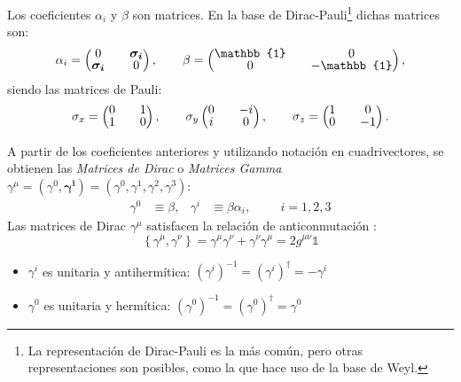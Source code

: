 Los coeficientes $\alpha_i$ y $\beta$ son matrices. En la base de Dirac-Pauli\footnote{La representación de Dirac-Pauli es la más común, pero otras representaciones son posibles, como la que hace uso de la base de Weyl.} dichas matrices son:
\begin{align}
\alpha _{i}=
\begingroup 
\renewcommand*{\arraystretch}{0.8}
\setlength\arraycolsep{10pt}
\begin{pmatrix} 
0 & \boldsymbol{\sigma_{i}} \\ \boldsymbol{\sigma_{i}} & 0 \end{pmatrix}, \qquad
\beta =\begin{pmatrix} \mathbb{1} & 0 \\ 0 & -\mathbb{1} \end{pmatrix},
\endgroup
\end{align}
siendo  las matrices de Pauli:
\begin{align}
\sigma _{x}=
\begingroup 
\renewcommand*{\arraystretch}{0.8}
\setlength\arraycolsep{10pt}
\begin{pmatrix} 
0 & 1 \\ 1 & 0 \end{pmatrix}, \qquad \sigma_y
\begin{pmatrix} 
0 & -i \\ i & 0 \end{pmatrix}, \qquad
\sigma_z =\begin{pmatrix} 1 & 0 \\ 0 & -1 \end{pmatrix}.
\endgroup
\end{align}

A partir de los coeficientes anteriores y utilizando notación en cuadrivectores, se obtienen las \textit{Matrices de Dirac} o \textit{Matrices Gamma}  $\gamma^{\mu}=(\gamma^0, \boldsymbol{\gamma^{i}})=(\gamma^0, \gamma^1, \gamma^2, \gamma^3)$:
\begin{align}
\gamma ^0 &\equiv \beta , & \gamma ^i &\equiv \beta \alpha_i , \hspace{1cm} i=1, 2, 3 \label{eq:matricesDirac}
\end{align}
Las matrices de Dirac $\gamma^{\mu}$ satisfacen la relación de anticonmutación \cite{MCR}:
\begin{equation}
\left\{ \gamma ^{\mu },\gamma ^{\nu }\right\} =\gamma ^{\mu }\gamma ^{\nu }+\gamma ^{\nu }\gamma ^{\mu }=2g^{\mu \nu }\mathbb{1}\label{eq:anticomm_relation}
\end{equation}
\begin{itemize}
\item $\gamma^{i}$ es unitaria y antihermítica: $\left( \gamma ^{i}\right) ^{-1}=\left( \gamma ^{i}\right) ^{\dagger}=-\gamma ^{i}$
\item $\gamma^{0}$ es unitaria y hermítica: $\left( \gamma ^{0}\right) ^{-1}=\left( \gamma ^{0}\right) ^{\dagger}=\gamma ^{0}$
\end{itemize}

